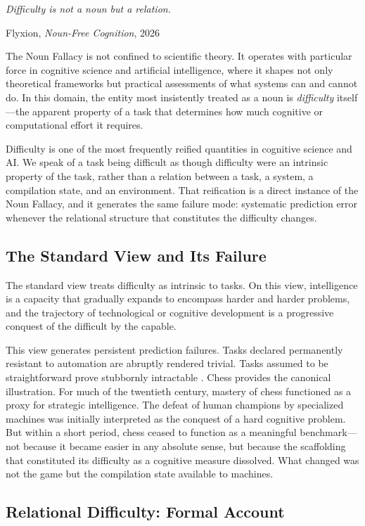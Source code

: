 \documentclass[12pt, a4paper]{article}
\theoremstyle{plain}
\theoremstyle{definition}
\theoremstyle{remark}
\begin{document}
\epigraph{\textit{Difficulty is not a noun but a relation.}}{Flyxion,
\emph{Noun-Free Cognition}, 2026}

\noindent
The Noun Fallacy is not confined to scientific theory. It operates with
particular force in cognitive science and artificial intelligence, where
it shapes not only theoretical frameworks but practical assessments of
what systems can and cannot do. In this domain, the entity most
insistently treated as a noun is \emph{difficulty} itself---the apparent
property of a task that determines how much cognitive or computational
effort it requires.

Difficulty is one of the most frequently reified quantities in cognitive
science and AI. We speak of a task being difficult as though difficulty
were an intrinsic property of the task, rather than a relation between
a task, a system, a compilation state, and an environment. That reification
is a direct instance of the Noun Fallacy, and it generates the same failure
mode: systematic prediction error whenever the relational structure that
constitutes the difficulty changes.

\subsection{The Standard View and Its Failure}

The standard view treats difficulty as intrinsic to tasks.
On this view, intelligence is a capacity that gradually expands to encompass
harder and harder problems, and the trajectory of technological or cognitive
development is a progressive conquest of the difficult by the capable.

This view generates persistent prediction failures. Tasks declared permanently
resistant to automation are abruptly rendered trivial. Tasks assumed to be
straightforward prove stubbornly intractable \citep{moravec1988,autor2015}.
Chess provides the canonical illustration. For much of the twentieth century,
mastery of chess functioned as a proxy for strategic intelligence. The defeat
of human champions by specialized machines was initially interpreted as the
conquest of a hard cognitive problem. But within a short period, chess ceased
to function as a meaningful benchmark---not because it became easier in any
absolute sense, but because the scaffolding that constituted its difficulty
as a cognitive measure dissolved. What changed was not the game but the
compilation state available to machines.

\subsection{Relational Difficulty: Formal Account}
\end{document}
